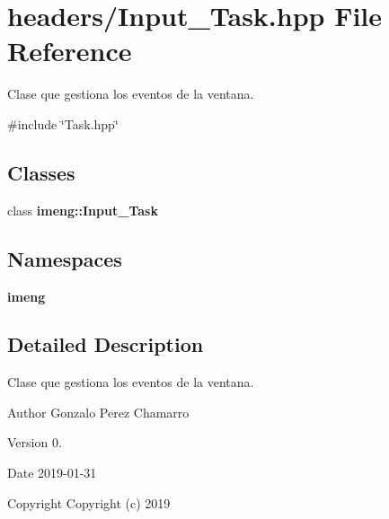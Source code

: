 \section{headers/\+Input\+\_\+\+Task.hpp File Reference}
\label{_input___task_8hpp}


Clase que gestiona los eventos de la ventana.  


{\ttfamily \#include \char`\"{}Task.\+hpp\char`\"{}}\newline
\subsection*{Classes}
\begin{DoxyCompactItemize}
\item 
class \textbf{ imeng\+::\+Input\+\_\+\+Task}
\end{DoxyCompactItemize}
\subsection*{Namespaces}
\begin{DoxyCompactItemize}
\item 
 \textbf{ imeng}
\end{DoxyCompactItemize}


\subsection{Detailed Description}
Clase que gestiona los eventos de la ventana. 

\begin{DoxyAuthor}{Author}
Gonzalo Perez Chamarro 
\end{DoxyAuthor}
\begin{DoxyVersion}{Version}
0. 
\end{DoxyVersion}
\begin{DoxyDate}{Date}
2019-\/01-\/31
\end{DoxyDate}
\begin{DoxyCopyright}{Copyright}
Copyright (c) 2019 
\end{DoxyCopyright}

